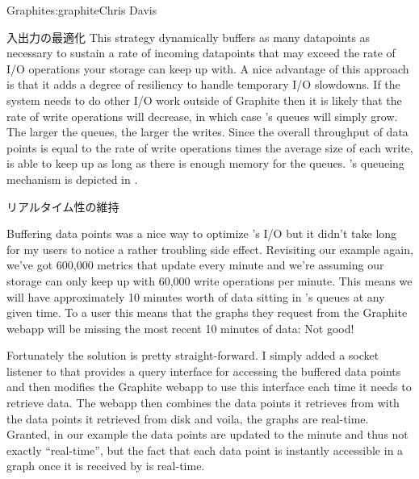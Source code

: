 \begin{aosachapter}{Graphite}{s:graphite}{Chris Davis}
\begin{aosasect1}{入出力の最適化}
This strategy dynamically buffers as many datapoints as necessary to sustain
a rate of incoming datapoints that may exceed the rate of I/O operations your
storage can keep up with. A nice advantage of this approach is that it adds a degree of
resiliency to handle temporary I/O slowdowns. If the system needs to
do other I/O work outside of Graphite then it is likely that the rate
of write operations will decrease, in which case 's queues will
simply grow. The larger the queues, the larger the writes. Since the
overall throughput of data points is equal to the rate of write
operations times the average size of each write,  is able to
keep up as long as there is enough memory for the queues.  's
queueing mechanism is depicted in .


\end{aosasect1}

\begin{aosasect1}{リアルタイム性の維持}

Buffering data points was a nice way to optimize 's I/O but it
didn't take long for my users to notice a rather troubling side
effect.  Revisiting our example again, we've got 600,000 metrics that
update every minute and we're assuming our storage can only keep up
with 60,000 write operations per minute. This means we will have
approximately 10 minutes worth of data sitting in 's queues at
any given time.  To a user this means that the graphs they request
from the Graphite webapp will be missing the most recent 10 minutes of
data: Not good!

Fortunately the solution is pretty straight-forward. I simply added a
socket listener to  that provides a query interface for
accessing the buffered data points and then modifies the Graphite
webapp to use this interface each time it needs to retrieve data.  The
webapp then combines the data points it retrieves from  with the
data points it retrieved from disk and voila, the graphs are
real-time. Granted, in our example the data points are updated to the
minute and thus not exactly ``real-time'', but the fact that each data
point is instantly accessible in a graph once it is received by 
is real-time.

\end{aosasect1}


\end{aosachapter}
